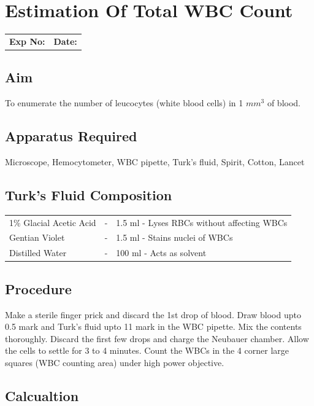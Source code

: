 \documentclass[a4paper,12pt]{book}
\begin{document}
					\chapter*{\centering Estimation Of Total WBC Count}

					\begin{tabular}{p{5in} p{1in}}
						\textbf{Exp No:}  & \textbf{Date:}\\
					\end{tabular}
					\section *{Aim}
					To enumerate the number of leucocytes (white blood cells) in 1 $mm^3$ of blood.
					\section*{Apparatus Required}
					Microscope, Hemocytometer, WBC pipette, Turk’s fluid, Spirit, Cotton, Lancet
					\section*{Turk's Fluid Composition}
					\begin{tabular}{l c l}

						1\% Glacial Acetic Acid	&	-&	1.5 ml - Lyses RBCs without affecting WBCs\\
						Gentian Violet&			-&	1.5 ml - Stains nuclei of WBCs\\
						Distilled Water&		-&	100 ml - Acts as solvent\\

					\end{tabular}
					\section*{Procedure}

					Make a sterile finger prick and discard the 1st drop of blood. Draw blood upto 0.5 mark and Turk’s fluid upto 11 mark in the WBC pipette. Mix the contents thoroughly. Discard the first few drops and charge the Neubauer chamber. Allow the cells to settle for 3 to 4 minutes. Count the WBCs in the 4 corner large squares (WBC counting area) under high power objective.

					\section*{Calcualtion}
\end{document}
